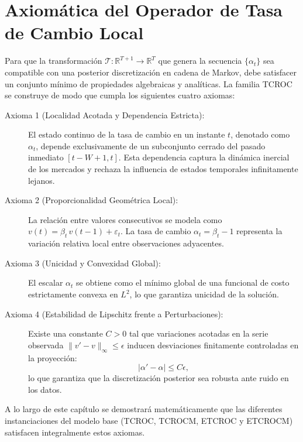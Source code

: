 
\section{Axiomática del Operador de Tasa de Cambio Local}
\label{sec:tcroc_axiomas}

Para que la transformación $\mathcal{T}: \mathbb{R}^{T+1} \to \mathbb{R}^T$ que genera la secuencia $\{\alpha_t\}$ sea compatible con una posterior discretización en cadena de Markov, debe satisfacer un conjunto mínimo de propiedades algebraicas y analíticas. La familia TCROC se construye de modo que cumpla los siguientes cuatro axiomas:

\begin{description}
    \item[Axioma 1 (Localidad Acotada y Dependencia Estricta):]
    El estado continuo de la tasa de cambio en un instante $t$,
    denotado como $\alpha_t$, depende exclusivamente de un
    subconjunto cerrado del pasado inmediato $[t-W+1, t]$.  Esta
    dependencia captura la dinámica inercial de los mercados y
    rechaza la influencia de estados temporales infinitamente
    lejanos.
    \item[Axioma 2 (Proporcionalidad Geométrica Local):] La relación entre valores consecutivos se modela como $v(t) = \beta_t\, v(t-1) + \varepsilon_t$. La tasa de cambio $\alpha_t = \beta_t - 1$ representa la variación relativa local entre observaciones adyacentes.
    \item[Axioma 3 (Unicidad y Convexidad Global):] El escalar $\alpha_t$ se obtiene como el mínimo global de una funcional de costo estrictamente convexa en $L^2$, lo que garantiza unicidad de la solución.
    \item[Axioma 4 (Estabilidad de Lipschitz frente a Perturbaciones):]
    Existe una constante $C > 0$ tal que variaciones acotadas en la
    serie observada $\|v' - v\|_\infty \leq \epsilon$ inducen
    desviaciones finitamente controladas en la proyección:
    \[
    |\alpha' - \alpha| \leq C\epsilon,
    \]
    lo que garantiza que la discretización posterior sea robusta ante ruido en los datos.
\end{description}

A lo largo de este capítulo se demostrará matemáticamente que las diferentes instanciaciones del modelo base (TCROC, TCROCM, ETCROC y ETCROCM) satisfacen integralmente estos axiomas.

